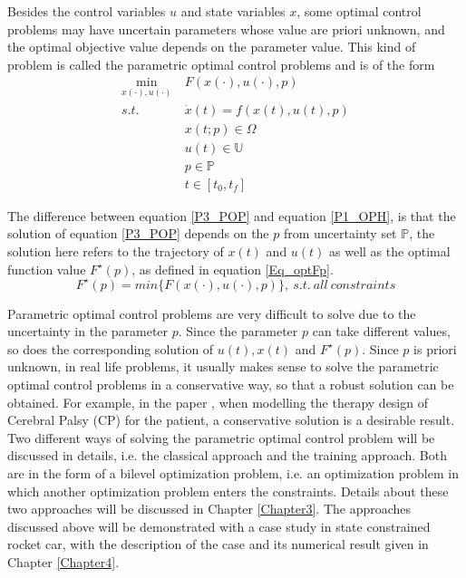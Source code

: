 \documentclass  [
  paper    = a4,
  BCOR     = 10mm,
  twoside,
  fontsize = 12pt,
  fleqn,
  toc      = bibnumbered,
  toc      = listofnumbered,
  numbers  = noendperiod,
  headings = normal,
  listof   = leveldown,
  version  = 3.03
]                                       {scrreprt}
\newcommand{\<}{\langle}
\renewcommand{\>}{\rangle}
\begin{document}
Besides the control variables $u$ and state variables $x$, some optimal control problems may have uncertain parameters whose value are priori unknown, and the optimal objective value depends on the parameter value. This kind of problem is called the parametric optimal control problems and is of the form 
      \begin{equation}
	\begin{aligned}
	\underset{x(\cdot), u(\cdot)}{\text{min}}  \ &  F(x(\cdot), u(\cdot), p) \\
	s.t.\ \  &  \dot{x} (t) = f(x(t), u(t),p)\\ 
	& x(t;p) \in \Omega \\
	& u(t) \in \mathbb{U}  \\
	& p  \in   \mathbb{P}  \\
	& t \in [t_0, t_f]
\end{aligned}
\label{P3_POP}
\end{equation}
  
The difference between equation \ref{P3_POP} and equation  \ref{P1_OPH}, is that the solution of equation \ref{P3_POP} depends on the $p$ from uncertainty set $ \mathbb{P}$, the solution here refers to the trajectory of $x(t)$ and $u(t)$ as well as the optimal function value $F^\star(p)$, as defined in equation \ref{Eq_optFp}.
\begin{equation}
	F^\star(p) = min \{ F(x(\cdot), u(\cdot), p) \}, \ s.t. \  all \ constraints
	\label{Eq_optFp}
\end{equation}	

Parametric optimal control problems are very difficult to solve due to the uncertainty in the parameter $p$. Since the parameter $p$ can take different values, so does the corresponding solution of $u(t), x(t)$ and $F^\star(p)$. Since $p$ is priori unknown, in real life problems, it usually makes sense to solve the parametric optimal control problems in a conservative way, so that a robust solution can be obtained. For example, in the paper \cite{MatSch22}, when modelling the therapy design of Cerebral Palsy (CP) for the patient, a conservative solution is a desirable result. Two different ways of solving the parametric optimal control problem will be discussed in details, i.e. the classical approach and the training approach. Both are in the form of a bilevel optimization problem, i.e. an optimization problem in which another optimization problem enters the constraints. Details about these two approaches will be discussed in Chapter \ref{Chapter3}. The approaches discussed above will be demonstrated with a case study in state constrained rocket car, with the description of the case and its numerical result given in Chapter \ref{Chapter4}.  
\end{document}

